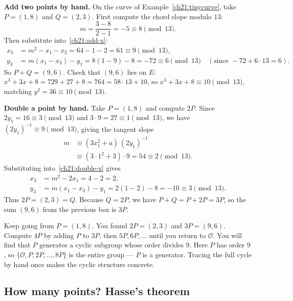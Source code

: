 \begin{walkbox}
\textbf{Add two points by hand.} On the curve of Example~\ref{ch21:tinycurve}, take
$P=(1,8)$ and $Q=(2,3)$. First compute the chord slope modulo $13$:
\[
m = \frac{3-8}{2-1} = -5 \equiv 8 \pmod{13}.
\]
Then substitute into~\eqref{ch21:add-x}:
\begin{align*}
x_3 &= m^2 - x_1 - x_2 = 64 - 1 - 2 = 61 \equiv 9 \pmod{13}, \\
y_3 &= m(x_1 - x_3) - y_1 = 8(1 - 9) - 8 = -72 \equiv 6 \pmod{13} \quad (\text{since }-72 + 6\cdot 13 = 6).
\end{align*}
So $P+Q = (9,6)$. Check that $(9,6)$ lies on $E$: $x^3+3x+8 = 729 + 27 + 8 = 764 =
58\cdot 13 + 10$, so $x^3 + 3x + 8 \equiv 10 \pmod{13}$, matching $y^2 = 36 \equiv 10
\pmod{13}$.
\end{walkbox}

\begin{walkbox}
\textbf{Double a point by hand.} Take $P=(1,8)$ and compute $2P$. Since $2y_1 = 16 \equiv 3
\pmod{13}$ and $3 \cdot 9 = 27 \equiv 1 \pmod{13}$, we have $(2y_1)^{-1} \equiv 9 \pmod{13}$,
giving the tangent slope
\begin{align*}
m &\equiv (3x_1^2 + a)\,(2y_1)^{-1} \\
  &\equiv (3\cdot 1^2 + 3)\cdot 9 = 54 \equiv 2 \pmod{13}.
\end{align*}
Substituting into~\eqref{ch21:double-x} gives
\begin{align*}
x_3 &= m^2 - 2x_1 = 4 - 2 = 2, \\
y_3 &= m(x_1 - x_3) - y_1 = 2(1 - 2) - 8 = -10 \equiv 3 \pmod{13}.
\end{align*}
Thus $2P = (2,3) = Q$. Because $Q = 2P$, we have $P + Q = P + 2P = 3P$, so the sum $(9,6)$
from the previous box is $3P$.
\end{walkbox}

\begin{labbox}
Keep going from $P=(1,8)$. You found $2P=(2,3)$ and $3P=(9,6)$. Compute $4P$ by adding
$P$ to $3P$, then $5P,6P,\dots$ until you return to $\mathcal{O}$. You will find that
$P$ generates a cyclic subgroup whose order divides $9$. Here $P$ has order $9$, so
$\{\mathcal{O},P,2P,\dots,8P\}$ is the entire group --- $P$ is a generator. Tracing the
full cycle by hand once makes the cyclic structure concrete.
\end{labbox}

\subsection{How many points? Hasse's theorem}
\label{ch21:hasse}

